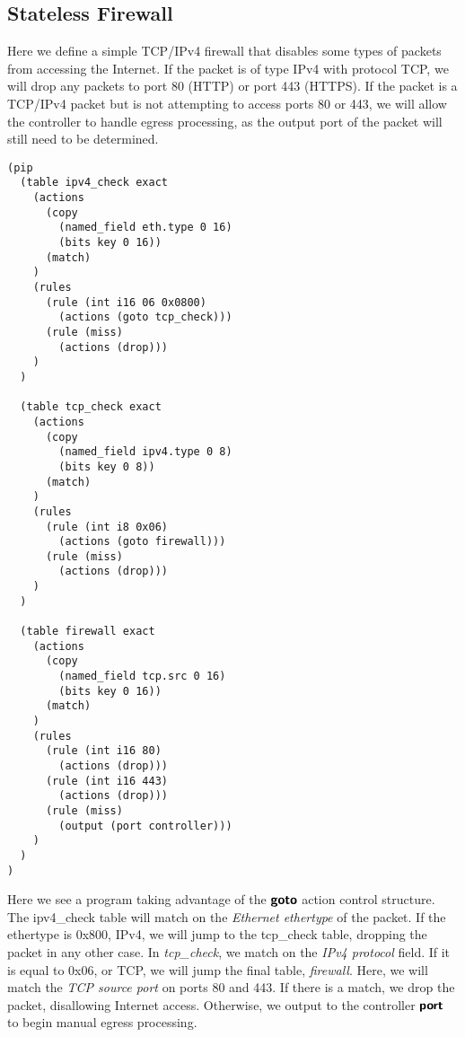 \subsection{Stateless Firewall}
Here we define a simple TCP/IPv4 firewall that disables some types of packets from accessing the Internet. If the packet is of type IPv4 with protocol TCP, we will drop any packets to port 80 (HTTP) or port 443 (HTTPS). If the packet is a TCP/IPv4 packet but is not attempting to access ports 80 or 443, we will allow the controller to handle egress processing, as the output port of the packet will still need to be determined.
\begin{verbatim}
(pip
  (table ipv4_check exact
    (actions
      (copy 
        (named_field eth.type 0 16)
        (bits key 0 16))
      (match)
    )
    (rules
      (rule (int i16 06 0x0800)
        (actions (goto tcp_check)))
      (rule (miss)
        (actions (drop)))
    )
  )

  (table tcp_check exact
    (actions
      (copy 
        (named_field ipv4.type 0 8)
        (bits key 0 8))
      (match)
    )
    (rules
      (rule (int i8 0x06)
        (actions (goto firewall)))
      (rule (miss)
        (actions (drop)))
    )
  )

  (table firewall exact
    (actions
      (copy
        (named_field tcp.src 0 16)
        (bits key 0 16))
      (match)
    )
    (rules
      (rule (int i16 80)
        (actions (drop)))
      (rule (int i16 443)
        (actions (drop)))
      (rule (miss)
        (output (port controller)))
    )
  )
)
\end{verbatim}

Here we see a program taking advantage of the $\bm{\mathsf{{goto}}}$ action control structure. The ipv4\_check table will match on the \textit{Ethernet ethertype} of the packet. If the ethertype is 0x800, IPv4, we will jump to the tcp\_check table, dropping the packet in any other case. In \textit{tcp\_check}, we match on the \textit{IPv4 protocol} field. If it is equal to 0x06, or TCP, we will jump the final table, \textit{firewall}. Here, we will match the \textit{TCP source port} on ports 80 and 443. If there is a match, we drop the packet, disallowing Internet access. Otherwise, we output to the controller $\bm{\mathsf{{port}}}$ to begin manual egress processing.
